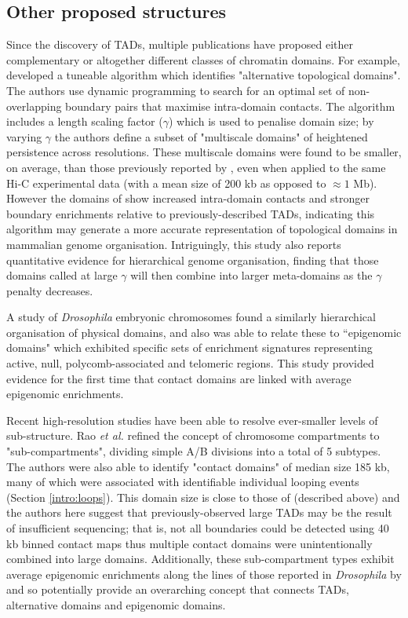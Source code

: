 \documentclass[a4paper,11pt,oneside]{book}
\begin{document}
\subsection{Other proposed structures}

Since the discovery of TADs, multiple publications have proposed either complementary or altogether different classes of chromatin domains. For example, \citet{Filippova2014} developed a tuneable algorithm which identifies "alternative topological domains". The authors use dynamic programming to search for an optimal set of non-overlapping boundary pairs that maximise intra-domain contacts. The algorithm includes a length scaling factor ($\gamma$) which is used to penalise domain size; by varying $\gamma$ the authors define a subset of "multiscale domains" of heightened persistence across resolutions.\cite{Filippova2014} These multiscale domains were found to be smaller, on average, than those previously reported by \citet{Dixon2012}, even when applied to the same Hi-C experimental data (with a mean size of 200 kb as opposed to $\approx 1$ Mb). However the domains of \citet{Filippova2014} show increased intra-domain contacts and stronger boundary enrichments relative to previously-described TADs, indicating this algorithm may generate a more accurate representation of topological domains in mammalian genome organisation. Intriguingly, this study also reports quantitative evidence for hierarchical genome organisation, finding that those domains called at large $\gamma$ will then combine into larger meta-domains as the $\gamma$ penalty decreases.\cite{Filippova2014}

A study of \emph{Drosophila} embryonic chromosomes found a similarly hierarchical organisation of physical domains, and also was able to relate these to ``epigenomic domains" which exhibited specific sets of enrichment signatures representing active, null, polycomb-associated and telomeric regions.\cite{Sexton2012} This study provided evidence for the first time that contact domains are linked with average epigenomic enrichments.

Recent high-resolution studies have been able to resolve ever-smaller levels of sub-structure. Rao \emph{et al.}\cite{Rao2014} refined the concept of chromosome compartments to "sub-compartments", dividing simple A/B divisions into a total of 5 subtypes. The authors were also able to identify "contact domains" of median size 185 kb, many of which were associated with identifiable individual looping events (Section \ref{intro:loops}).\cite{Rao2014} This domain size is close to those of \citet{Filippova2014} (described above) and the authors here suggest that previously-observed large TADs may be the result of insufficient sequencing; that is, not all boundaries could be detected using 40 kb binned contact maps thus multiple contact domains were unintentionally combined into large domains. Additionally, these sub-compartment types exhibit average epigenomic enrichments along the lines of those reported in \emph{Drosophila} by \citet{Sexton2012} and so potentially provide an overarching concept that connects TADs, alternative domains and epigenomic domains.
\end{document}
